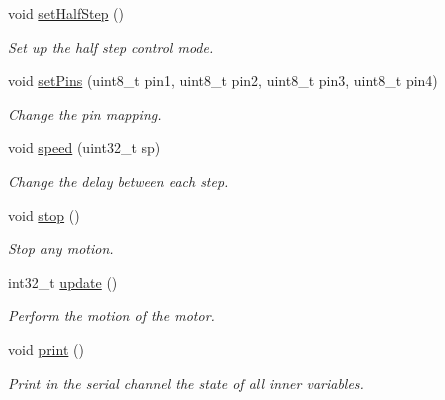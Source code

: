 \begin{DoxyCompactItemize}
void \hyperlink{class_s_motor_a1c4101303e66c321fbaf0f7969906910}{set\+Half\+Step} ()
\begin{DoxyCompactList}\small\item\em Set up the half step control mode. \end{DoxyCompactList}\item 
void \hyperlink{class_s_motor_a9d76c875ebc8686bf6d1bc70aba7b652}{set\+Pins} (uint8\+\_\+t pin1, uint8\+\_\+t pin2, uint8\+\_\+t pin3, uint8\+\_\+t pin4)
\begin{DoxyCompactList}\small\item\em Change the pin mapping. \end{DoxyCompactList}\item 
void \hyperlink{class_s_motor_af87213cf4f416f8182a299e193c28fdc}{speed} (uint32\+\_\+t sp)
\begin{DoxyCompactList}\small\item\em Change the delay between each step. \end{DoxyCompactList}\item 
void \hyperlink{class_s_motor_afc966d69cfe8f90a0c640e1e24f7b2c6}{stop} ()
\begin{DoxyCompactList}\small\item\em Stop any motion. \end{DoxyCompactList}\item 
int32\+\_\+t \hyperlink{class_s_motor_a4aee8957f93b071ea7772e5d2c766500}{update} ()
\begin{DoxyCompactList}\small\item\em Perform the motion of the motor. \end{DoxyCompactList}\item 
void \hyperlink{class_s_motor_a70f9d62a3979a923b1e7c90deae30853}{print} ()
\begin{DoxyCompactList}\small\item\em Print in the serial channel the state of all inner variables. \end{DoxyCompactList}\end{DoxyCompactItemize}
